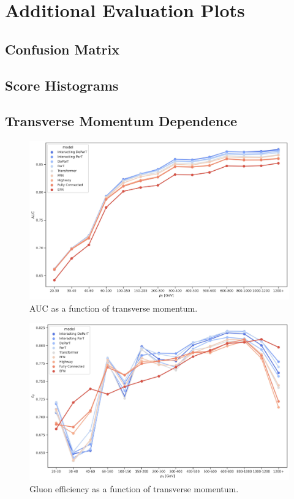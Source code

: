 \chapter{Additional Evaluation Plots}
\label{ch:eval}

\section{Confusion Matrix}
\label{sec:app_confusion}


\FloatBarrier
\newpage

\section{Score Histograms}
\label{sec:app_scorehist}


\FloatBarrier

\section{Transverse Momentum Dependence}
\label{sec:app_pt_dep}


\begin{figure}[htb]
    \centering
    \includegraphics[width=0.95\linewidth]{src/plots/results/pT_dep/auc.jpg}
    \caption{AUC as a function of transverse momentum.}
    \label{fig:auc_pt}
\end{figure}

\begin{figure}[htb]
    \centering
    \includegraphics[width=0.95\linewidth]{src/plots/results/pT_dep/gluon_efficiency.jpg}
    \caption{Gluon efficiency as a function of transverse momentum.}
    \label{fig:gluon_eff_pt}
\end{figure}

